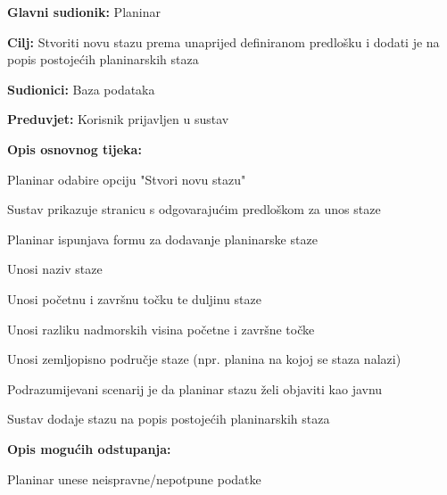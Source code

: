 			\noindent {}
			\begin{packed_item}
				
				\item \textbf{Glavni sudionik: }$ $Planinar$ $
				\item  \textbf{Cilj:} $ $Stvoriti novu stazu prema unaprijed definiranom predlošku i dodati je na popis postojećih planinarskih staza$ $
				\item  \textbf{Sudionici:} $ $Baza podataka$ $
				\item  \textbf{Preduvjet:} $ $Korisnik prijavljen u sustav$ $
				\item  \textbf{Opis osnovnog tijeka:}
				
				\item[] \begin{packed_enum}
					
					\item $ $Planinar odabire opciju "Stvori novu stazu"$ $
					\item $ $Sustav prikazuje stranicu s odgovarajućim predloškom za unos staze$ $
					\item $ $Planinar ispunjava formu za dodavanje planinarske staze$ $
					\begin{packed_enum}
						\item Unosi naziv staze
						\item Unosi početnu i završnu točku te duljinu staze
						\item Unosi razliku nadmorskih visina početne i završne točke
						\item Unosi zemljopisno područje staze (npr. planina na kojoj se staza nalazi)
						\item Podrazumijevani scenarij je da planinar stazu želi objaviti kao javnu
					\end{packed_enum}	
					\item $ $Sustav dodaje stazu na popis postojećih planinarskih staza$ $
				\end{packed_enum}
				\item  \textbf{Opis mogućih odstupanja:}
				
				\item[] \begin{packed_item}
					
					\item[3.a] $ $Planinar unese neispravne/nepotpune podatke$ $
					\item[] \begin{packed_enum}
						

\end{packed_enum}
\end{packed_item}
\end{packed_item}
